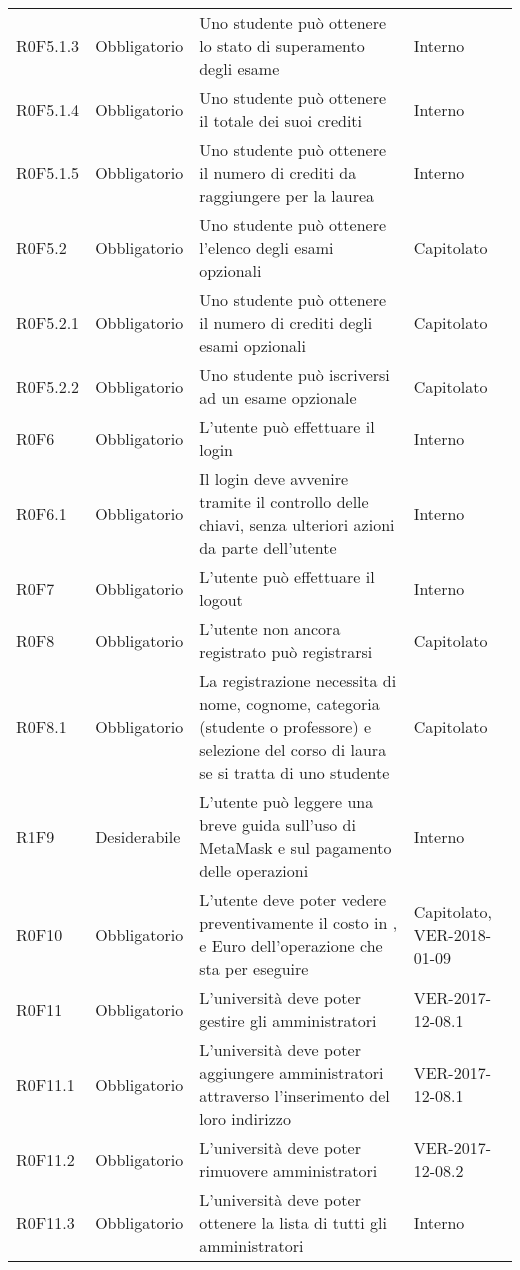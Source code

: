 \documentclass[AnalisiDeiRequisiti.tex]{subfiles}
\begin{document}
\begin{longtable}[H]{p{2.6cm}p{2.5cm}p{5cm}p{2cm}}
	R0F5.1.3 & Obbligatorio & Uno studente può ottenere lo stato di superamento degli esame & Interno \\
	R0F5.1.4 & Obbligatorio & Uno studente può ottenere il totale dei suoi crediti & Interno \\
	R0F5.1.5 & Obbligatorio & Uno studente può ottenere il numero di crediti da raggiungere per la laurea & Interno \\
	R0F5.2 & Obbligatorio & Uno studente può ottenere l'elenco degli esami opzionali & Capitolato \\
	R0F5.2.1 & Obbligatorio & Uno studente può ottenere il numero di crediti degli esami opzionali & Capitolato \\
	R0F5.2.2 & Obbligatorio & Uno studente può iscriversi ad un esame opzionale & Capitolato \\
	R0F6 & Obbligatorio & L'utente può effettuare il login & Interno \\
	R0F6.1 & Obbligatorio & Il login deve avvenire tramite il controllo delle chiavi, senza ulteriori azioni da parte dell'utente & Interno \\
	R0F7 & Obbligatorio & L'utente può effettuare il logout & Interno \\
	R0F8 & Obbligatorio & L'utente non ancora registrato può registrarsi & Capitolato \\
	R0F8.1 & Obbligatorio & La registrazione necessita di nome, cognome, categoria (studente o professore) e selezione del corso di laura se si tratta di uno studente & Capitolato \\
	R1F9 & Desiderabile & L'utente può leggere una breve guida sull'uso di MetaMask e sul pagamento delle operazioni & Interno \\	
	R0F10 & Obbligatorio & L'utente deve poter vedere preventivamente il costo in \citGloss{Gas}, \citGloss{Ether} e Euro dell'operazione che sta per eseguire & Capitolato, VER-2018-01-09 \\	
	R0F11 & Obbligatorio & L'università deve poter gestire gli amministratori & VER-2017-12-08.1 \\
	R0F11.1 & Obbligatorio & L'università deve poter aggiungere amministratori attraverso l'inserimento del loro indirizzo & VER-2017-12-08.1 \\
	R0F11.2 & Obbligatorio & L'università deve poter rimuovere amministratori & VER-2017-12-08.2 \\
	R0F11.3 & Obbligatorio & L'università deve poter ottenere la lista di tutti gli amministratori & Interno \\

\end{longtable}
\end{document}
